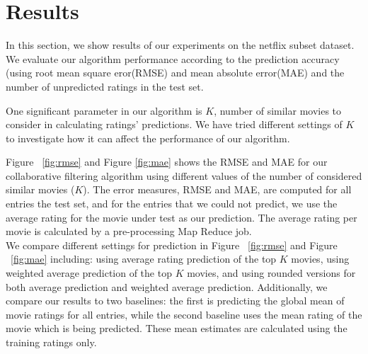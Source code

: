 \section{Results}
In this section, we show results of our experiments on the netflix subset dataset. We evaluate our algorithm performance according to the prediction accuracy (using root mean square eror(RMSE) and mean absolute error(MAE) and the number of unpredicted ratings in the test set.

One significant parameter in our algorithm is $K$, number of similar movies to consider in calculating ratings' predictions. We have tried different settings of $K$ to investigate how it can affect the performance of our algorithm. 


Figure ~\ref{fig:rmse} and Figure \ref{fig:mae} shows the RMSE and MAE for our collaborative filtering algorithm using different values of the number of considered similar movies ($K$). The error measures, RMSE and MAE, are computed for all entries the test set, and for the entries that we could not predict, we use the average rating for the movie under test as our prediction. The average rating per movie is calculated by a pre-processing Map Reduce job. \\

We compare different settings for prediction in Figure ~\ref{fig:rmse} and Figure ~\ref{fig:mae} including: using average rating prediction of the top $K$ movies, using weighted average prediction of the top $K$ movies, and using rounded versions for both average prediction and weighted average prediction. Additionally, we compare our results to two baselines: the first is predicting the global mean of movie ratings for all entries, while the second baseline uses the mean rating of the movie which is being predicted. These mean estimates are calculated using the training ratings only.\\


